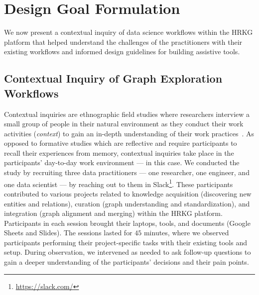 \section{Design Goal Formulation}
\label{sec:design_goal}
We now present a contextual inquiry of data science workflows within the HRKG platform 
that helped understand the challenges of the practitioners with their existing workflows and informed design guidelines for building assistive tools.

\subsection{Contextual Inquiry of Graph Exploration Workflows}
Contextual inquiries are ethnographic field studies where researchers interview a small group of people in their natural environment as they conduct their work activities (\textit{context}) to gain an in-depth understanding of their work practices~\cite{holtzblatt1997contextual}. 
As opposed to formative studies which are reflective and require participants to recall their experiences from memory, contextual inquiries take place in the participants' day-to-day work environment --- \company in this case.
We conducted the study by recruiting three data practitioners --- one researcher, one engineer, and one data scientist --- by reaching out to them in Slack\footnote{\url{https://slack.com/}}. 
These participants contributed to various projects related to knowledge acquisition (discovering new entities and relations), curation (graph understanding and standardization), and integration (graph alignment and merging) within the HRKG platform. Participants in each session brought their laptops, tools, and documents (Google Sheets and Slides).
The sessions lasted for $45$ minutes, where we observed participants performing their project-specific tasks with their existing tools and setup.
During observation, we intervened as needed to ask follow-up questions to gain a deeper understanding of the participants'
decisions and their pain points. 

